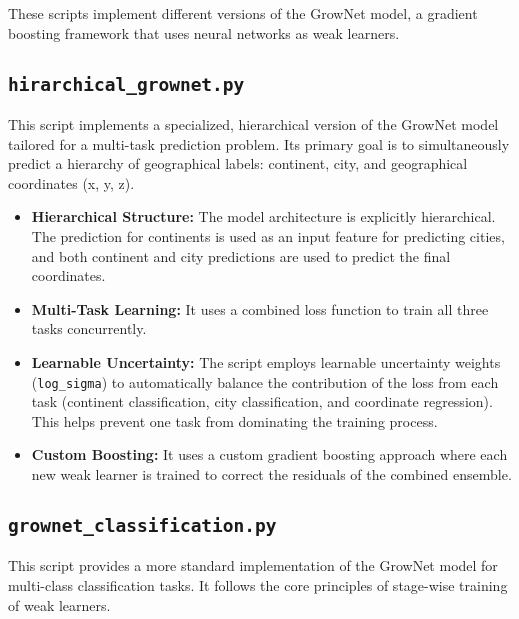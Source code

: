 \documentclass{article}
\begin{document}
These scripts implement different versions of the GrowNet model, a gradient boosting framework that uses neural networks as weak learners.


\subsection*{\texttt{hirarchical\_grownet.py}}
This script implements a specialized, hierarchical version of the GrowNet model tailored for a multi-task prediction problem. Its primary goal is to simultaneously predict a hierarchy of geographical labels: continent, city, and geographical coordinates (x, y, z).

\begin{itemize}
    \item \textbf{Hierarchical Structure:} The model architecture is explicitly hierarchical. The prediction for continents is used as an input feature for predicting cities, and both continent and city predictions are used to predict the final coordinates.
    \item \textbf{Multi-Task Learning:} It uses a combined loss function to train all three tasks concurrently.
    \item \textbf{Learnable Uncertainty:} The script employs learnable uncertainty weights (\texttt{log\_sigma}) to automatically balance the contribution of the loss from each task (continent classification, city classification, and coordinate regression). This helps prevent one task from dominating the training process.
    \item \textbf{Custom Boosting:} It uses a custom gradient boosting approach where each new weak learner is trained to correct the residuals of the combined ensemble.
\end{itemize}

\subsection*{\texttt{grownet\_classification.py}}
This script provides a more standard implementation of the GrowNet model for multi-class classification tasks. It follows the core principles of stage-wise training of weak learners.
\end{document}
